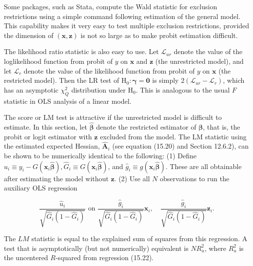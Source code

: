 \documentclass[10pt]{article}
\begin{document}
Some packages, such as Stata, compute the Wald statistic for exclusion restrictions using a simple command following estimation of the general model. This capability makes it very easy to test multiple exclusion restrictions, provided the dimension of $(\mathbf{x}, \mathbf{z})$ is not so large as to make probit estimation difficult.

The likelihood ratio statistic is also easy to use. Let $\mathscr{L}_{u r}$ denote the value of the loglikelihood function from probit of $y$ on $\mathbf{x}$ and $\mathbf{z}$ (the unrestricted model), and let $\mathscr{L}_{r}$ denote the value of the likelihood function from probit of $y$ on $\mathbf{x}$ (the restricted model). Then the LR test of $\mathrm{H}_{0}: \boldsymbol{\gamma}=\mathbf{0}$ is simply $2\left(\mathscr{L}_{u r}-\mathscr{L}_{r}\right)$, which has an asymptotic $\chi_{Q}^{2}$ distribution under $\mathrm{H}_{0}$. This is analogous to the usual $F$ statistic in OLS analysis of a linear model.

The score or LM test is attractive if the unrestricted model is difficult to estimate. In this section, let $\hat{\boldsymbol{\beta}}$ denote the restricted estimator of $\boldsymbol{\beta}$, that is, the probit or logit estimator with $\mathbf{z}$ excluded from the model. The LM statistic using the estimated expected Hessian, $\hat{\mathbf{A}}_{i}$ (see equation (15.20) and Section 12.6.2), can be shown to be numerically identical to the following: (1) Define $\hat{u}_{i} \equiv y_{i}-G\left(\mathbf{x}_{i} \hat{\boldsymbol{\beta}}\right), \hat{G}_{i} \equiv G\left(\mathbf{x}_{i} \hat{\boldsymbol{\beta}}\right)$, and $\hat{g}_{i} \equiv g\left(\mathbf{x}_{i} \hat{\boldsymbol{\beta}}\right)$. These are all obtainable after estimating the model without $\mathbf{z}$. (2) Use all $N$ observations to run the auxiliary OLS regression


\begin{equation*}
\frac{\hat{u}_{i}}{\sqrt{\hat{G}_{i}\left(1-\hat{G}_{i}\right)}} \text { on } \frac{\hat{g}_{i}}{\sqrt{\hat{G}_{i}\left(1-\hat{G}_{i}\right)}} \mathbf{x}_{i}, \quad \frac{\hat{g}_{i}}{\sqrt{\hat{G}_{i}\left(1-\hat{G}_{i}\right)}} \mathbf{z}_{i} . \tag{15.22}
\end{equation*}


The $L M$ statistic is equal to the explained sum of squares from this regression. A test that is asymptotically (but not numerically) equivalent is $N R_{u}^{2}$, where $R_{u}^{2}$ is the uncentered $R$-squared from regression (15.22).
\end{document}
